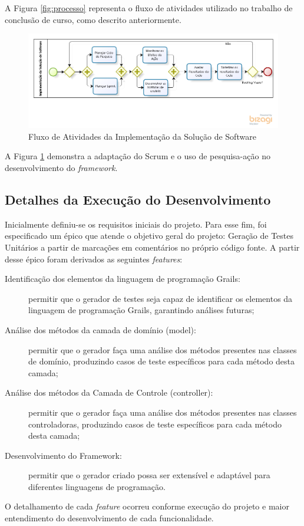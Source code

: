 \par 
\indent A Figura \ref{fig:processo} representa o fluxo de atividades utilizado no trabalho de conclusão de curso, como descrito anteriormente.  
  
    \begin{figure}[h]
    \centering
    \includegraphics[width=\textwidth]{figuras/ProcessoInterno.png}
    \caption{Fluxo de Atividades da Implementação da Solução de Software}
    \label{fig:processointerno}
  \end{figure}

\par 
\indent A Figura \ref{fig:processointerno} demonstra a adaptação do Scrum e o uso de pesquisa-ação no desenvolvimento do \textit{framework}. 
 
\subsection{Detalhes da Execução do Desenvolvimento}
	Inicialmente definiu-se os requisitos iniciais do projeto. Para esse fim, foi especificado um épico que atende o objetivo geral do projeto: \textsf{Geração de Testes Unitários a partir de marcações em comentários no próprio código fonte}. A partir desse épico foram derivados as seguintes \textit{features}:
	\begin{description}
	\item[Identificação dos elementos da linguagem de programação Grails:] permitir que o gerador de testes seja capaz de identificar os elementos da linguagem de programação Grails, garantindo análises futuras;
	\item[Análise dos métodos da camada de domínio (model):] permitir que o gerador faça uma análise dos métodos presentes nas classes de domínio, produzindo casos de teste específicos para cada método desta camada;
	\item[Análise dos métodos da Camada de Controle (controller):] permitir que o gerador faça uma análise dos métodos presentes nas classes controladoras, produzindo casos de teste específicos para cada método desta camada;
	\item[Desenvolvimento do Framework:] permitir que o gerador criado possa ser extensível e adaptável para diferentes linguagens de programação.
	\end{description}
\par
\indent O detalhamento de cada \textit{feature} ocorreu conforme execução do projeto e maior entendimento do desenvolvimento de cada funcionalidade.

